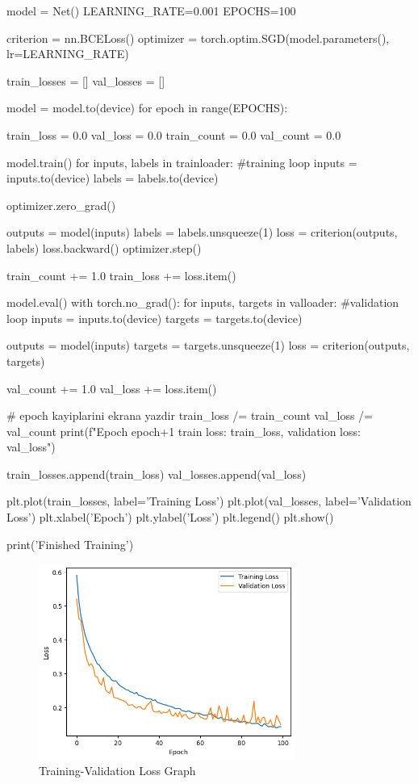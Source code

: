 \documentclass[11pt]{article}
\begin{document}
\begin{python}
model = Net()
LEARNING_RATE=0.001
EPOCHS=100

criterion = nn.BCELoss()
optimizer = torch.optim.SGD(model.parameters(), lr=LEARNING_RATE)

train_losses = []
val_losses = []

model = model.to(device)
for epoch in range(EPOCHS):

  train_loss = 0.0
  val_loss = 0.0
  train_count = 0.0
  val_count = 0.0
  
  model.train()
  for inputs, labels in trainloader:
      #training loop
      inputs = inputs.to(device)
      labels = labels.to(device)

      optimizer.zero_grad()

      outputs = model(inputs)
      labels = labels.unsqueeze(1)
      loss = criterion(outputs, labels)
      loss.backward()
      optimizer.step()

      train_count += 1.0
      train_loss += loss.item()
    

  model.eval()
  with torch.no_grad():
    for inputs, targets in valloader:
      #validation loop
      inputs = inputs.to(device)
      targets = targets.to(device)

      outputs = model(inputs)
      targets = targets.unsqueeze(1)
      loss = criterion(outputs, targets)

      val_count += 1.0
      val_loss += loss.item()

    # epoch kayiplarini ekrana yazdir
  train_loss /= train_count
  val_loss /= val_count
  print(f"Epoch {epoch+1} train loss: {train_loss}, validation loss: {val_loss}")

  train_losses.append(train_loss)
  val_losses.append(val_loss)

plt.plot(train_losses, label='Training Loss')
plt.plot(val_losses, label='Validation Loss')
plt.xlabel('Epoch')
plt.ylabel('Loss')
plt.legend()
plt.show()
        

print('Finished Training')
\end{python}


\begin{figure}[ht!]
    \centering
    \includegraphics[width=0.75\textwidth]{loss_graph.png}
    \caption{Training-Validation Loss Graph}
    \label{fig:my_pic}
\end{figure}
\end{document}
